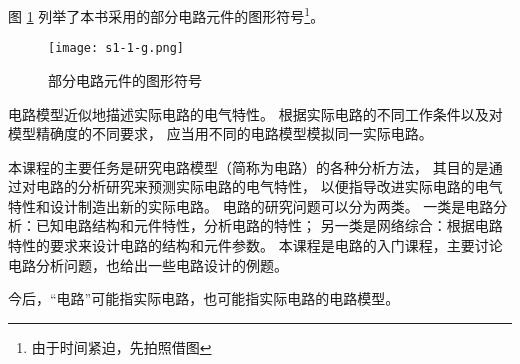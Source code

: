 图 \ref{fig:fig1_1_1} 列举了本书采用的部分电路元件的图形符号\footnote{由于时间紧迫，先拍照借图}。

\begin{figure}[htbp]
\centering
\texttt{[image: s1-1-g.png]}
\caption{部分电路元件的图形符号}\label{fig:fig1_1_1}
\end{figure}

电路模型近似地描述实际电路的电气特性。
根据实际电路的不同工作条件以及对模型精确度的不同要求，
应当用不同的电路模型模拟同一实际电路。

本课程的主要任务是研究电路模型（简称为电路）的各种分析方法，
其目的是通过对电路的分析研究来预测实际电路的电气特性，
以便指导改进实际电路的电气特性和设计制造出新的实际电路。
电路的研究问题可以分为两类。
一类是电路分析：已知电路结构和元件特性，分析电路的特性；
另一类是网络综合：根据电路特性的要求来设计电路的结构和元件参数。
本课程是电路的入门课程，主要讨论电路分析问题，也给出一些电路设计的例题。

今后，“电路”可能指实际电路，也可能指实际电路的电路模型。
